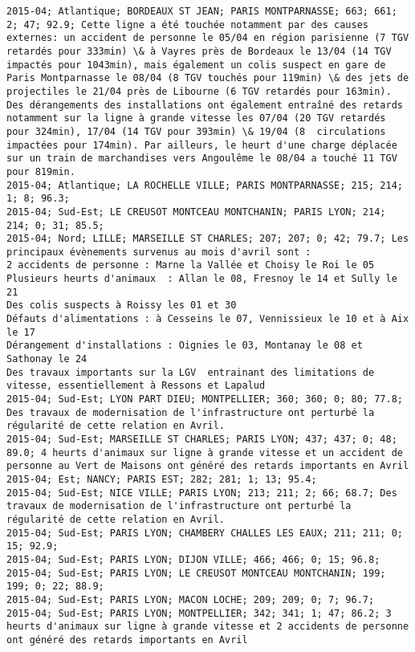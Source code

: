 \documentclass{article}
\begin{document}
\begin{Verbatim}[commandchars=\\\{\}]
2015-04; Atlantique; BORDEAUX ST JEAN; PARIS MONTPARNASSE; 663; 661; 2; 47; 92.9; Cette ligne a été touchée notamment par des causes externes: un accident de personne le 05/04 en région parisienne (7 TGV retardés pour 333min) \& à Vayres près de Bordeaux le 13/04 (14 TGV impactés pour 1043min), mais également un colis suspect en gare de Paris Montparnasse le 08/04 (8 TGV touchés pour 119min) \& des jets de projectiles le 21/04 près de Libourne (6 TGV retardés pour 163min). Des dérangements des installations ont également entraîné des retards notamment sur la ligne à grande vitesse les 07/04 (20 TGV retardés pour 324min), 17/04 (14 TGV pour 393min) \& 19/04 (8  circulations impactées pour 174min). Par ailleurs, le heurt d'une charge déplacée sur un train de marchandises vers Angoulême le 08/04 a touché 11 TGV pour 819min.
2015-04; Atlantique; LA ROCHELLE VILLE; PARIS MONTPARNASSE; 215; 214; 1; 8; 96.3; 
2015-04; Sud-Est; LE CREUSOT MONTCEAU MONTCHANIN; PARIS LYON; 214; 214; 0; 31; 85.5; 
2015-04; Nord; LILLE; MARSEILLE ST CHARLES; 207; 207; 0; 42; 79.7; Les principaux évènements survenus au mois d'avril sont :
2 accidents de personne : Marne la Vallée et Choisy le Roi le 05
Plusieurs heurts d'animaux  : Allan le 08, Fresnoy le 14 et Sully le 21
Des colis suspects à Roissy les 01 et 30
Défauts d'alimentations : à Cesseins le 07, Vennissieux le 10 et à Aix le 17
Dérangement d'installations : Oignies le 03, Montanay le 08 et Sathonay le 24
Des travaux importants sur la LGV  entrainant des limitations de vitesse, essentiellement à Ressons et Lapalud
2015-04; Sud-Est; LYON PART DIEU; MONTPELLIER; 360; 360; 0; 80; 77.8; Des travaux de modernisation de l'infrastructure ont perturbé la régularité de cette relation en Avril.
2015-04; Sud-Est; MARSEILLE ST CHARLES; PARIS LYON; 437; 437; 0; 48; 89.0; 4 heurts d'animaux sur ligne à grande vitesse et un accident de personne au Vert de Maisons ont généré des retards importants en Avril 
2015-04; Est; NANCY; PARIS EST; 282; 281; 1; 13; 95.4; 
2015-04; Sud-Est; NICE VILLE; PARIS LYON; 213; 211; 2; 66; 68.7; Des travaux de modernisation de l'infrastructure ont perturbé la régularité de cette relation en Avril.
2015-04; Sud-Est; PARIS LYON; CHAMBERY CHALLES LES EAUX; 211; 211; 0; 15; 92.9; 
2015-04; Sud-Est; PARIS LYON; DIJON VILLE; 466; 466; 0; 15; 96.8; 
2015-04; Sud-Est; PARIS LYON; LE CREUSOT MONTCEAU MONTCHANIN; 199; 199; 0; 22; 88.9; 
2015-04; Sud-Est; PARIS LYON; MACON LOCHE; 209; 209; 0; 7; 96.7; 
2015-04; Sud-Est; PARIS LYON; MONTPELLIER; 342; 341; 1; 47; 86.2; 3 heurts d'animaux sur ligne à grande vitesse et 2 accidents de personne ont généré des retards importants en Avril 

\end{Verbatim}
\end{document}
